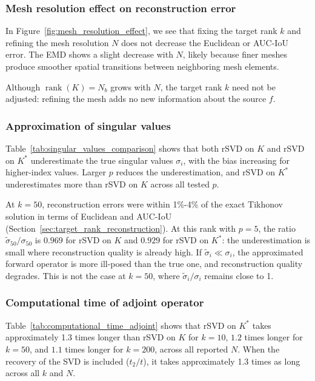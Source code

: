 \subsubsection{Mesh resolution effect on reconstruction error}\label{sec:mesh_resolution_effect_on_reconstruction_error}

In Figure~\ref{fig:mesh_resolution_effect}, we see that fixing the target rank $k$ and refining the mesh resolution $N$ does not decrease the Euclidean or AUC-IoU error. The EMD shows a slight decrease with $N$, likely because finer meshes produce smoother spatial transitions between neighboring mesh elements.

Although $\operatorname{rank}(K) = N_b$ grows with $N$, the target rank $k$ need not be adjusted: refining the mesh adds no new information about the source $f$.


\subsubsection{Approximation of singular values}\label{sec:approximation_of_singular_values}

Table~\ref{tab:singular_values_comparison} shows that both rSVD on $K$ and rSVD on $K^*$ underestimate the true singular values $\sigma_i$, with the bias increasing for higher-index values. Larger $p$ reduces the underestimation, and rSVD on $K^*$ underestimates more than rSVD on $K$ across all tested $p$.

At $k = 50$, reconstruction errors were within 1\%-4\% of the exact Tikhonov solution in terms of Euclidean and AUC-IoU (Section~\ref{sec:target_rank_reconstruction}). At this rank with $p = 5$, the ratio $\tilde \sigma_{50}/\sigma_{50}$ is $0.969$ for rSVD on $K$ and $0.929$ for rSVD on $K^*$: the underestimation is small where reconstruction quality is already high. If $\tilde \sigma_i \ll \sigma_i$, the approximated forward operator is more ill-posed than the true one, and reconstruction quality degrades. This is not the case at $k = 50$, where $\tilde \sigma_i / \sigma_i$ remains close to 1.


\subsubsection{Computational time of adjoint operator}

Table~\ref{tab:computational_time_adjoint} shows that rSVD on $K^*$ takes approximately 1.3 times longer than rSVD on $K$ for $k = 10$, $1.2$ times longer for $k = 50$, and $1.1$ times longer for $k = 200$, across all reported $N$. When the recovery of the SVD is included ($t_2 / t$), it takes approximately 1.3 times as long across all $k$ and $N$.

